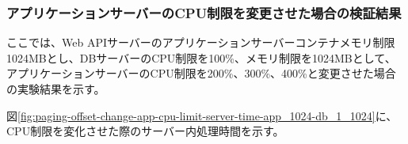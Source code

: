 \documentclass[../../../../main]{subfiles}
\begin{document}
    \subsubsection{アプリケーションサーバーのCPU制限を変更させた場合の検証結果}\label{subsubsec:result-paging-offset-change-app-cpu}

    ここでは、Web APIサーバーのアプリケーションサーバーコンテナメモリ制限1024MBとし、DBサーバーのCPU制限を100\%、メモリ制限を1024MBとして、アプリケーションサーバーのCPU制限を200\%、300\%、400\%と変更させた場合の実験結果を示す。


    図\ref{fig:paging-offset-change-app-cpu-limit-server-time-app_1024-db_1_1024}に、CPU制限を変化させた際のサーバー内処理時間を示す。

    


    
\end{document}
